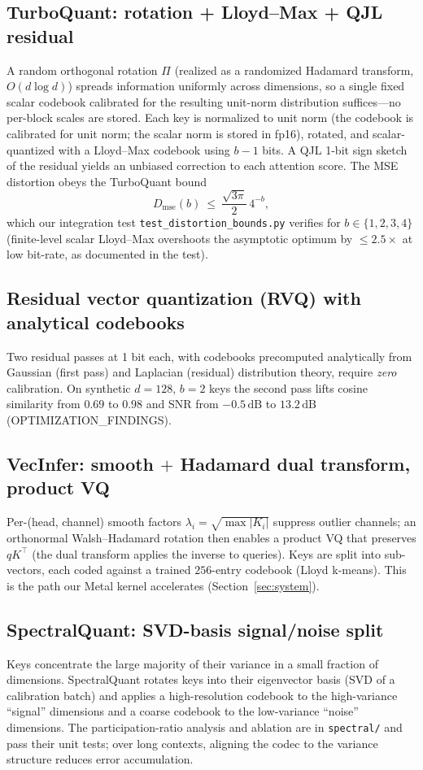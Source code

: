 \documentclass[11pt]{article}
\begin{document}
\subsection{TurboQuant: rotation + Lloyd--Max + QJL residual}
A random orthogonal rotation $\Pi$ (realized as a randomized Hadamard
transform, $O(d\log d)$) spreads information uniformly across dimensions, so a
single fixed scalar codebook calibrated for the resulting unit-norm
distribution suffices---no per-block scales are stored. Each key is
normalized to unit norm (the codebook is calibrated for unit norm; the scalar
norm is stored in fp16), rotated, and scalar-quantized with a Lloyd--Max
codebook using $b{-}1$ bits. A QJL 1-bit sign sketch of the residual yields
an unbiased correction to each attention score.
The MSE distortion obeys the TurboQuant bound
\begin{equation}
D_{\mathrm{mse}}(b)\ \le\ \frac{\sqrt{3\pi}}{2}\,4^{-b},
\label{eq:tqbound}
\end{equation}
which our integration test \texttt{test\_distortion\_bounds.py} verifies for
$b\in\{1,2,3,4\}$ (finite-level scalar Lloyd--Max overshoots the asymptotic
optimum by $\le 2.5\times$ at low bit-rate, as documented in the test).

\subsection{Residual vector quantization (RVQ) with analytical codebooks}
Two residual passes at 1 bit each, with codebooks precomputed analytically
from Gaussian (first pass) and Laplacian (residual) distribution theory,
require \emph{zero} calibration. On synthetic $d{=}128,\,b{=}2$ keys the
second pass lifts cosine similarity from $0.69$ to $0.98$ and SNR from
$-0.5\,\mathrm{dB}$ to $13.2\,\mathrm{dB}$ (OPTIMIZATION\_FINDINGS).

\subsection{VecInfer: smooth $+$ Hadamard dual transform, product VQ}
Per-(head, channel) smooth factors $\lambda_i=\sqrt{\max|K_i|}$ suppress
outlier channels; an orthonormal Walsh--Hadamard rotation then enables a
product VQ that preserves $q K^\top$ (the dual transform applies the inverse
to queries). Keys are split into sub-vectors, each coded against a trained
$256$-entry codebook (Lloyd k-means). This is the path our Metal kernel
accelerates (Section~\ref{sec:system}).

\subsection{SpectralQuant: SVD-basis signal/noise split}
Keys concentrate the large majority of their variance in a small fraction of
dimensions. SpectralQuant rotates keys into their eigenvector basis (SVD of a
calibration batch) and applies a high-resolution codebook to the
high-variance ``signal'' dimensions and a coarse codebook to the low-variance
``noise'' dimensions. The participation-ratio analysis and ablation are in
\texttt{spectral/} and pass their unit tests; over long contexts, aligning the
codec to the variance structure reduces error accumulation.
\end{document}
